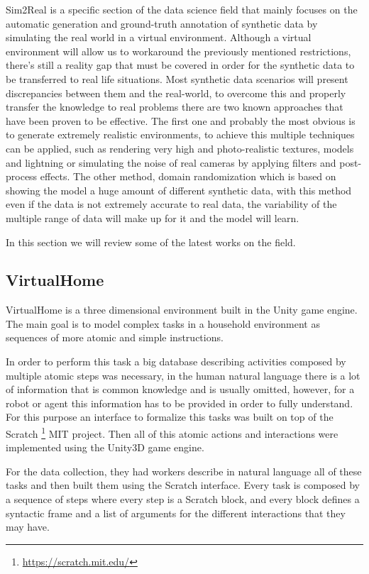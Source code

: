 Sim2Real is a specific section of the data science field that mainly focuses on the automatic generation and ground-truth annotation of synthetic data by simulating the real world in a virtual environment. Although a virtual environment will allow us to workaround the previously mentioned restrictions, there's still a reality gap that must be covered in order for the synthetic data to be transferred to real life situations. Most synthetic data scenarios will present discrepancies between them and the real-world, to overcome this and properly transfer the knowledge to real problems there are two known approaches that have been proven to be effective. The first one and probably the most obvious is to generate extremely realistic environments, to achieve this multiple techniques can be applied, such as rendering very high and photo-realistic textures, models and lightning or simulating the noise of real cameras by applying filters and post-process effects. The other method, domain randomization \cite{DBLP:journals/corr/TobinFRSZA17} which is based on showing the model a huge amount of different synthetic data, with this method even if the data is not extremely accurate to real data, the variability of the multiple range of data will make up for it and the model will learn.

In this section we will review some of the latest works on the field.

\subsection{VirtualHome}
VirtualHome is a three dimensional environment built in the Unity game engine. The main goal is to model complex tasks in a household environment as sequences of more atomic and simple instructions.
 
In order to perform this task a big database describing activities composed by multiple atomic steps was necessary, in the human natural language there is a lot of information that is common knowledge and is usually omitted, however, for a robot or agent this information has to be provided in order to fully understand. For this purpose an interface to formalize this tasks was built on top of the Scratch \footnote{\url{https://scratch.mit.edu/}} MIT project. Then all of this atomic actions and interactions were implemented using the Unity3D game engine.

For the data collection, they had workers describe in natural language all of these tasks and then built them using the Scratch interface. Every task is composed by a sequence of steps where every step is a Scratch block, and every block defines a syntactic frame and a list of arguments for the different interactions that they may have.


